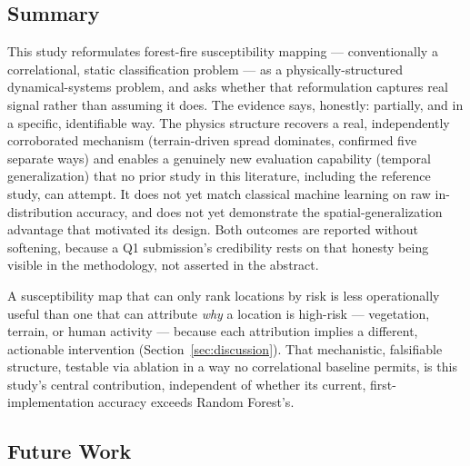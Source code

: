 \documentclass[journal]{IEEEtran}
\begin{document}
\subsection{Summary}

This study reformulates forest-fire susceptibility mapping --- conventionally a correlational, static classification problem --- as a physically-structured dynamical-systems problem, and asks whether that reformulation captures real signal rather than assuming it does. The evidence says, honestly: partially, and in a specific, identifiable way. The physics structure recovers a real, independently corroborated mechanism (terrain-driven spread dominates, confirmed five separate ways) and enables a genuinely new evaluation capability (temporal generalization) that no prior study in this literature, including the reference study, can attempt. It does not yet match classical machine learning on raw in-distribution accuracy, and does not yet demonstrate the spatial-generalization advantage that motivated its design. Both outcomes are reported without softening, because a Q1 submission's credibility rests on that honesty being visible in the methodology, not asserted in the abstract.

A susceptibility map that can only rank locations by risk is less operationally useful than one that can attribute \emph{why} a location is high-risk --- vegetation, terrain, or human activity --- because each attribution implies a different, actionable intervention (Section~\ref{sec:discussion}). That mechanistic, falsifiable structure, testable via ablation in a way no correlational baseline permits, is this study's central contribution, independent of whether its current, first-implementation accuracy exceeds Random Forest's.

\subsection{Future Work}
\label{sec:future}
\end{document}
